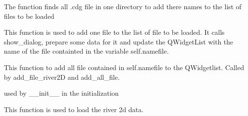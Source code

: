 \documentclass[letterpaper,10pt,english]{sphinxmanual}
\begin{document}
\begin{fulllineitems}
\begin{fulllineitems}
\label{\detokenize{index:src_GUI.hydro_GUI_2.River2D.add_all_file}}
The function finds all .cdg file in one directory to add there names to the list of files to be loaded

\end{fulllineitems}


\begin{fulllineitems}
\label{\detokenize{index:src_GUI.hydro_GUI_2.River2D.add_file_river2d}}
This function is used to add one file to the list of file to be loaded.
It calls show\_dialog, prepare some data for it and update the QWidgetList with
the name of the file containted in the variable self.namefile.

\end{fulllineitems}


\begin{fulllineitems}
\label{\detokenize{index:src_GUI.hydro_GUI_2.River2D.add_file_to_list}}
This function to add all file contained in self.namefile to the QWidgetlist. Called by add\_file\_river2D and
add\_all\_file.

\end{fulllineitems}


\begin{fulllineitems}
\label{\detokenize{index:src_GUI.hydro_GUI_2.River2D.init_iu}}
used by \_\_init\_\_ in the initialization

\end{fulllineitems}


\begin{fulllineitems}
\label{\detokenize{index:src_GUI.hydro_GUI_2.River2D.load_river2d_gui}}
This function is used to load the river 2d data.

\end{fulllineitems}


\end{fulllineitems}
\end{document}
